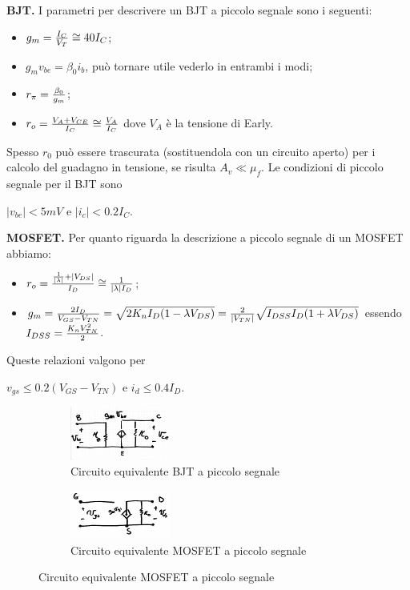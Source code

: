 \documentclass[a4paper,portrait,12pt]{article}
\theoremstyle{definition}
\begin{document}
\textbf{BJT.} I parametri per descrivere un BJT a piccolo segnale sono i seguenti:
\begin{itemize}
\item $g_m = {I_C \over V_T} \cong 40 I_C$;
\item $g_m v_{be} = \beta_0 i_b$, può tornare utile vederlo in entrambi i modi;
\item $r_{\pi} = {\beta_0 \over g_m}$;
\item $r_o = {V_A + V_{CE} \over I_C} \cong {V_A \over I_C}$ dove $V_A$ è la tensione di Early.
\end{itemize}
Spesso $r_0$ può essere trascurata (sostituendola con un circuito aperto) per i calcolo del guadagno in 
tensione, se risulta $A_v \ll \mu_f$. Le condizioni di piccolo segnale per il BJT sono
\begin{center}
$\left|v_{be}\right| < 5 mV$ \quad e \quad $\left|i_c\right| < 0.2 I_C$.
\end{center}
\bigskip

\textbf{MOSFET.} Per quanto riguarda la descrizione a piccolo segnale di un MOSFET abbiamo:
\begin{itemize}
\item $r_o = {{1 \over \left|\lambda \right|} + \left|V_{DS}\right| \over I_D} \cong {1 \over \left|\lambda
	\right| I_D}$;
\item $g_m = {2 I_D \over V_{GS} - V_{TN}} = \sqrt{2 K_n I_D (1 - \lambda V_{DS})} = {2 \over \left|V_{TN}
	\right|} \sqrt{I_{DSS} I_D (1 + \lambda V_{DS})}$ essendo $I_{DSS} = {K_n V_{TN}^2 \over 2}$.
\end{itemize}
Queste relazioni valgono per
\begin{center}
$v_{gs} \le 0.2 (V_{GS} - V_{TN})$ \quad e \quad $i_d \le 0.4 I_D$.
\end{center}
\bigskip

\begin{figure}[H]
\begin{subfigure}{.5\textwidth}
\centering
\includegraphics[width=.5\linewidth]{img/bjtpiccolo.pdf}
\caption{Circuito equivalente BJT a piccolo segnale}
\label{fig:integratore}
\end{subfigure}
\begin{subfigure}{.5\textwidth}
\centering
\includegraphics[width=.5\linewidth]{img/mospiccolo.pdf}
\caption{Circuito equivalente MOSFET a piccolo segnale}
\label{fig:derivatore}
\end{subfigure}
\end{figure}
\end{document}
